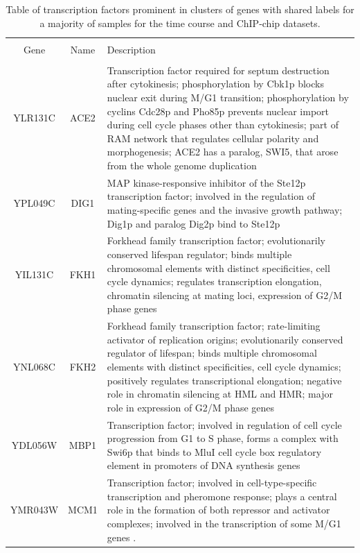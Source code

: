 \documentclass[]{article}
\begin{document}
	\begin{longtable}{@{\extracolsep{3pt}} ccp{85mm}} 
	\caption{Table of transcription factors prominent in clusters of genes with shared labels for a majority of samples for the time course  and ChIP-chip datasets.}
	\\[-1.8ex]\hline 
	\hline \\[-1.8ex] 
	Gene & Name & Description \\ 
	\hline \\[-1.8ex] 
		YLR131C & ACE2 & Transcription factor required for septum destruction after cytokinesis; phosphorylation by Cbk1p blocks nuclear exit during M/G1 transition; phosphorylation by cyclins Cdc28p and Pho85p prevents nuclear import during cell cycle phases other than cytokinesis; part of RAM network that regulates cellular polarity and morphogenesis; ACE2 has a paralog, SWI5, that arose from the whole genome duplication \\ 
		YPL049C & DIG1 & MAP kinase-responsive inhibitor of the Ste12p transcription factor; involved in the regulation of mating-specific genes and the invasive growth pathway; Dig1p and paralog Dig2p bind to Ste12p
		\\ 
		YIL131C & FKH1 & Forkhead family transcription factor; evolutionarily conserved lifespan regulator; binds multiple chromosomal elements with distinct specificities, cell cycle dynamics; regulates transcription elongation, chromatin silencing at mating loci, expression of G2/M phase genes \\ 
		YNL068C & FKH2 & Forkhead family transcription factor; rate-limiting activator of replication origins; evolutionarily conserved regulator of lifespan; binds multiple chromosomal elements with distinct specificities, cell cycle dynamics; positively regulates transcriptional elongation; negative role in chromatin silencing at HML and HMR; major role in expression of G2/M phase genes \\ 
		YDL056W & MBP1 & Transcription factor; involved in regulation of cell cycle progression from G1 to S phase, forms a complex with Swi6p that binds to MluI cell cycle box regulatory element in promoters of DNA synthesis genes \\ 
		YMR043W & MCM1 & Transcription factor; involved in cell-type-specific transcription and pheromone response; plays a central role in the formation of both repressor and activator complexes; involved in the transcription of some M/G1 genes \cite{simon2001serial}.  \\ 

\end{longtable}
\end{document}
